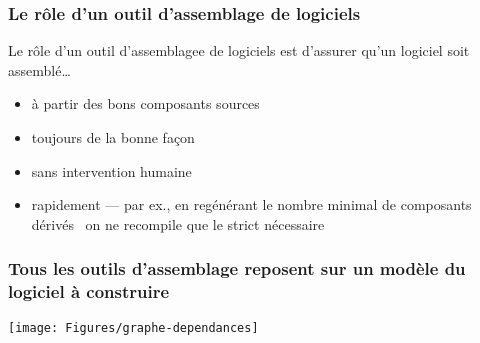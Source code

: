 \begin{frame}
\frametitle{Le r\^ole d'un outil d'assemblage de logiciels}

Le r\^ole d'un outil d'assemblagee de logiciels est d'assurer qu'un
logiciel soit assembl\'e\ldots

\VF

\begin{itemize}
\item \alert{\`a partir des bons composants sources}

\VF

\item \alert{toujours de la bonne fa\c{c}on}

\VF

\item \alert{sans intervention humaine}

\VF

\item \alert{rapidement} --- par ex., en reg\'en\'erant
le nombre \alert{minimal} de composants d\'eriv\'es \Implique\ on ne
recompile que le strict n\'ecessaire


\VF

\end{itemize}

\NOTE{\ }

\end{frame}

\begin{frame}
\frametitle{Tous les outils d'assemblage reposent sur un mod\`ele du logiciel \`a
construire\Implique\ }

\begin{center}
\texttt{[image: Figures/graphe-dependances]}

\end{center}


\end{frame}

